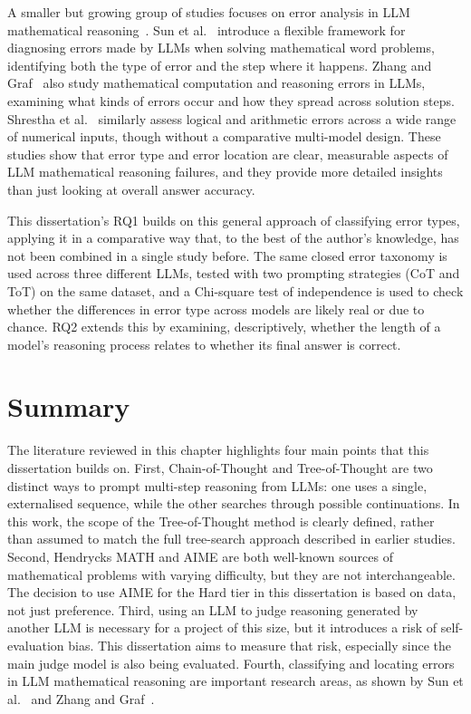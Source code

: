 A smaller but growing group of studies focuses on error analysis in LLM
mathematical reasoning~\cite{wang2025survey}. Sun et
al.~\cite{sun2025errorclassification} introduce a flexible framework for
diagnosing errors made by LLMs when solving mathematical word problems,
identifying both the type of error and the step where it happens. Zhang
and Graf~\cite{zhang2025mathematical} also study mathematical computation
and reasoning errors in LLMs, examining what kinds of errors occur and
how they spread across solution steps. Shrestha et
al.~\cite{shrestha2025logical} similarly assess logical and arithmetic
errors across a wide range of numerical inputs, though without a
comparative multi-model design. These studies show that error type
and error location are clear, measurable aspects of LLM mathematical
reasoning failures, and they provide more detailed insights than just
looking at overall answer accuracy.

This dissertation's RQ1 builds on this general approach of classifying
error types, applying it in a comparative way that, to the best of the
author's knowledge, has not been combined in a single study before. The
same closed error taxonomy is used across three different LLMs, tested
with two prompting strategies (CoT and ToT) on the same dataset, and a
Chi-square test of independence is used to check whether the differences
in error type across models are likely real or due to chance. RQ2 extends
this by examining, descriptively, whether the length of a model's
reasoning process relates to whether its final answer is correct.

\section{Summary}

The literature reviewed in this chapter highlights four main points that
this dissertation builds on. First, Chain-of-Thought and Tree-of-Thought
are two distinct ways to prompt multi-step reasoning from LLMs: one uses a
single, externalised sequence, while the other searches through possible
continuations. In this work, the scope of the Tree-of-Thought method is
clearly defined, rather than assumed to match the full tree-search
approach described in earlier studies. Second, Hendrycks MATH and AIME
are both well-known sources of mathematical problems with varying
difficulty, but they are not interchangeable. The decision to use AIME
for the Hard tier in this dissertation is based on data, not just
preference. Third, using an LLM to judge reasoning generated by another
LLM is necessary for a project of this size, but it introduces a risk of
self-evaluation bias. This dissertation aims to measure that risk,
especially since the main judge model is also being evaluated. Fourth,
classifying and locating errors in LLM mathematical reasoning are
important research areas, as shown by Sun et
al.~\cite{sun2025errorclassification} and Zhang and
Graf~\cite{zhang2025mathematical}.

